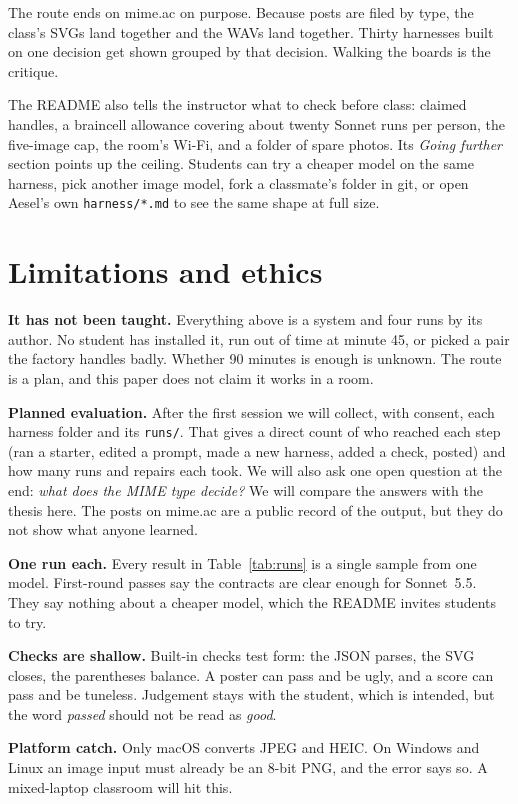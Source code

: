 \documentclass[10pt,letterpaper,twocolumn]{article}
\newcommand{\code}[1]{\texttt{#1}}
\begin{document}
The route ends on mime.ac on purpose. Because posts are filed by type, the
class's SVGs land together and the WAVs land together. Thirty harnesses built
on one decision get shown grouped by that decision. Walking the boards is the
critique.

The README also tells the instructor what to check before class: claimed
handles, a braincell allowance covering about twenty Sonnet runs per
person, the five-image cap, the room's Wi-Fi, and a folder of spare photos.
Its \emph{Going further} section points up the ceiling. Students can try a
cheaper model on the same harness, pick another image model, fork a
classmate's folder in git, or open Aesel's own \code{harness/*.md} to see the
same shape at full size.

\section{Limitations and ethics}
\label{sec:limits}

\textbf{It has not been taught.} Everything above is a system and four runs
by its author. No student has installed it, run out of time at minute 45, or
picked a pair the factory handles badly. Whether 90 minutes is enough is
unknown. The route is a plan, and this paper does not claim it works in a
room.

\textbf{Planned evaluation.} After the first session we will collect, with
consent, each harness folder and its \code{runs/}. That gives a direct
count of who reached each step (ran a starter, edited a prompt, made a new
harness, added a check, posted) and how many runs and repairs each took. We
will also ask one open question at the end: \emph{what does the MIME type
decide?} We will compare the answers with the thesis here. The posts on
mime.ac are a public record of the output, but they do not show what anyone
learned.

\textbf{One run each.} Every result in Table~\ref{tab:runs} is a single
sample from one model. First-round passes say the contracts are clear enough
for Sonnet~5.5. They say nothing about a cheaper model, which the README
invites students to try.

\textbf{Checks are shallow.} Built-in checks test form: the JSON parses, the
SVG closes, the parentheses balance. A poster can pass and be ugly, and a
score can pass and be tuneless. Judgement stays with the student, which is
intended, but the word \emph{passed} should not be read as \emph{good}.

\textbf{Platform catch.} Only macOS converts JPEG and HEIC. On Windows and
Linux an image input must already be an 8-bit PNG, and the error says so.
A mixed-laptop classroom will hit this.
\end{document}
